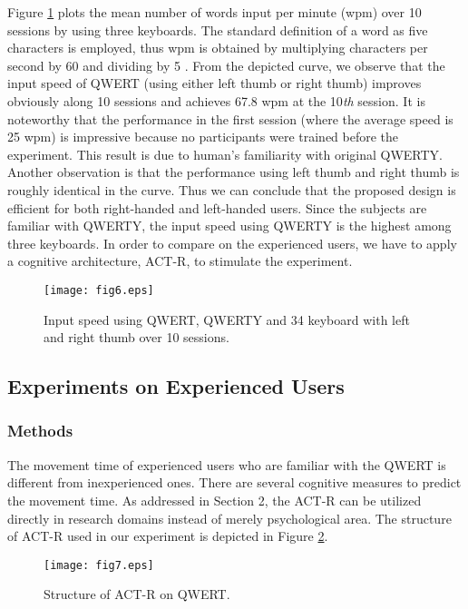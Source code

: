 \documentclass{singlecol-new}
\theoremstyle{TH}{
\newtheorem{lemma}{Lemma}
\newtheorem{theorem}[lemma]{Theorem}
\newtheorem{corrolary}[lemma]{Corrolary}
\newtheorem{conjecture}[lemma]{Conjecture}
\newtheorem{proposition}[lemma]{Proposition}
\newtheorem{claim}[lemma]{Claim}
\newtheorem{stheorem}[lemma]{Wrong Theorem}
\newtheorem{algorithm}{Algorithm}
}
\theoremstyle{THrm}{
\newtheorem{definition}{Definition}[section]
\newtheorem{question}{Question}[section]
\newtheorem{remark}{Remark}
\newtheorem{scheme}{Scheme}
}
\theoremstyle{THhit}{
\newtheorem{case}{Case}[section]
}
\begin{document}
Figure \ref{fig.perf} plots the mean number of words input per minute (wpm) over 10 sessions by using three keyboards. The standard definition of a word as five characters is employed, thus wpm is obtained by multiplying characters per second by 60 and dividing by 5 \citep{mackenzie2002text}. From the depicted curve, we observe that the input speed of QWERT (using either left thumb or right thumb) improves obviously along 10 sessions and achieves 67.8 wpm at the 10\textit{th} session. It is noteworthy that the performance in the first session (where the average speed is 25 wpm) is impressive because no participants were trained before the experiment. This result is due to human's familiarity with original QWERTY. Another observation is that the performance using left thumb and right thumb is roughly identical in the curve. Thus we can conclude that the proposed design is efficient for both right-handed and left-handed users. Since the subjects are familiar with QWERTY, the input speed using QWERTY is the highest among three keyboards. In order to compare on the experienced users, we have to apply a cognitive architecture, ACT-R,  to stimulate the experiment. \\

\begin{figure}
  \centering
  \caption{Input speed using QWERT, QWERTY and 34 keyboard with left and right thumb over 10 sessions.}\label{fig.perf}
  \texttt{[image: fig6.eps]}
\end{figure}

\subsection{Experiments on Experienced Users}

\subsubsection{Methods}

The movement time of experienced users who are familiar with the QWERT is different from inexperienced ones. There are several cognitive measures to predict the movement time. As addressed in Section 2, the ACT-R can be utilized directly in research domains instead of merely psychological area. The structure of ACT-R used in our experiment is depicted in Figure \ref{fig.str}. \\

\begin{figure}
  \centering
  \caption{Structure of ACT-R on QWERT.}\label{fig.str}
  \texttt{[image: fig7.eps]}
\end{figure}
\end{document}
